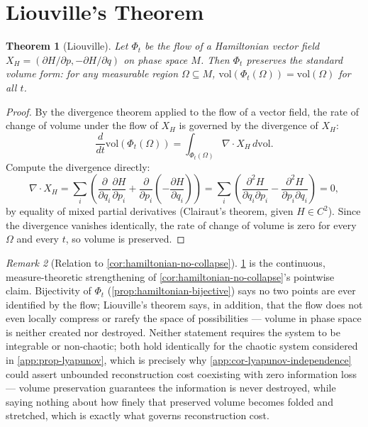 \documentclass[11pt]{book}
\theoremstyle{plain}
\newtheorem{theorem}{Theorem}[chapter]
\theoremstyle{definition}
\theoremstyle{remark}
\newtheorem{remark}[theorem]{Remark}
\begin{document}
\section{Liouville's Theorem}

\begin{theorem}[Liouville]
\label{app:thm-liouville}
Let $\Phi_t$ be the flow of a Hamiltonian vector field $X_H =
(\partial H/\partial p, -\partial H/\partial q)$ on phase space $M$.
Then $\Phi_t$ preserves the standard volume form: for any measurable
region $\Omega \subseteq M$, $\mathrm{vol}(\Phi_t(\Omega)) =
\mathrm{vol}(\Omega)$ for all $t$.
\end{theorem}

\begin{proof}
By the divergence theorem applied to the flow of a vector field, the
rate of change of volume under the flow of $X_H$ is governed by the
divergence of $X_H$:
\[
\frac{d}{dt}\mathrm{vol}(\Phi_t(\Omega)) = \int_{\Phi_t(\Omega)} \nabla \cdot X_H \, d\mathrm{vol}.
\]
Compute the divergence directly:
\[
\nabla \cdot X_H = \sum_i \left( \frac{\partial}{\partial q_i}\frac{\partial H}{\partial p_i} + \frac{\partial}{\partial p_i}\left(-\frac{\partial H}{\partial q_i}\right) \right) = \sum_i \left( \frac{\partial^2 H}{\partial q_i \partial p_i} - \frac{\partial^2 H}{\partial p_i \partial q_i} \right) = 0,
\]
by equality of mixed partial derivatives (Clairaut's theorem, given
$H \in C^2$). Since the divergence vanishes identically, the rate of
change of volume is zero for every $\Omega$ and every $t$, so volume
is preserved.
\end{proof}

\begin{remark}[Relation to \cref{cor:hamiltonian-no-collapse}]
\cref{app:thm-liouville} is the continuous, measure-theoretic
strengthening of \cref{cor:hamiltonian-no-collapse}'s pointwise claim.
Bijectivity of $\Phi_t$ (\cref{prop:hamiltonian-bijective}) says no
two points are ever identified by the flow; Liouville's theorem says,
in addition, that the flow does not even locally compress or
rarefy the space of possibilities --- volume in phase space is neither
created nor destroyed. Neither statement requires the system to be
integrable or non-chaotic; both hold identically for the chaotic
system considered in \cref{app:prop-lyapunov}, which is precisely why
\cref{app:cor-lyapunov-independence} could assert unbounded
reconstruction cost coexisting with zero information loss --- volume
preservation guarantees the information is never destroyed, while
saying nothing about how finely that preserved volume becomes folded
and stretched, which is exactly what governs reconstruction cost.
\end{remark}
\end{document}
